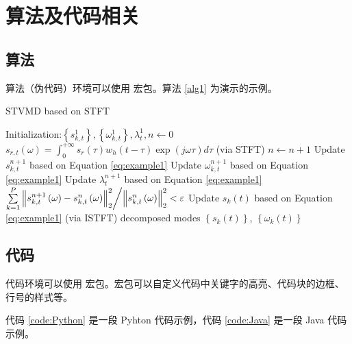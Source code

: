 \documentclass[report,oneside,UTF8,zihao=-4]{config}
\begin{document}

\chapter{算法及代码相关}

\section{算法}

算法（伪代码）环境可以使用  宏包。算法 \ref{alg1} 为演示的示例。

\begin{algorithm}
	\caption{STVMD based on STFT}
	\label{alg1}
	\begin{algorithmic}[1]
		\STATE Initialization:$\left\{ {s_{k,t}^1} \right\},\left\{ {\omega _{k,t}^1} \right\},\lambda _t^1,n \leftarrow 0$
		\STATE  ${s_{r,t}}\left( \omega  \right) = \int_0^{ + \infty } {{s_r}\left( \tau  \right){w_h}\left( {t - \tau } \right)} \exp \left( {j\omega \tau } \right)d\tau $   (via STFT)
		\REPEAT
		\STATE $n \leftarrow n + 1$
		\STATE Update $ s_{k,t}^{n + 1} $ based on Equation \eqref{eq:example1}
		\STATE Update $\omega _{k,t}^{n + 1}$ based on Equation \eqref{eq:example1}
		\STATE Update $\lambda _t^{n + 1} $ based on Equation \eqref{eq:example1}
		\UNTIL $\sum\limits_{k=1}^P  {{{\left\| {s_{k,t}^{n + 1}\left( \omega  \right) - s_{k,t}^n\left( \omega  \right)} \right\|_2^2} \mathord{\left/
					{\vphantom {{\left\| {s_{k,t}^{n + 1}\left( \omega  \right) - s_{k,t}^n\left( \omega  \right)} \right\|_2^2} {\left\| {s_{k,t}^n\left( \omega  \right)} \right\|_2^2}}} \right.
					\kern-\nulldelimiterspace} {\left\| {s_{k,t}^n\left( \omega  \right)} \right\|_2^2}}}  < \varepsilon $  
		\STATE   Update ${s_k}\left( t \right)$ based on Equation \eqref{eq:example1}  (via ISTFT)
		\ENSURE  decomposed modes $ \left\{ {{s_k}\left( t \right)} \right\}$, $\left\{ {{\omega _k}\left( t \right)} \right\}$
	\end{algorithmic}  
\end{algorithm}

\section{代码}

代码环境可以使用  宏包。宏包可以自定义代码中关键字的高亮、代码块的边框、行号的样式等。

代码 \ref{code:Python} 是一段 Pyhton 代码示例，代码 \ref{code:Java} 是一段 Java 代码示例。
\end{document}
